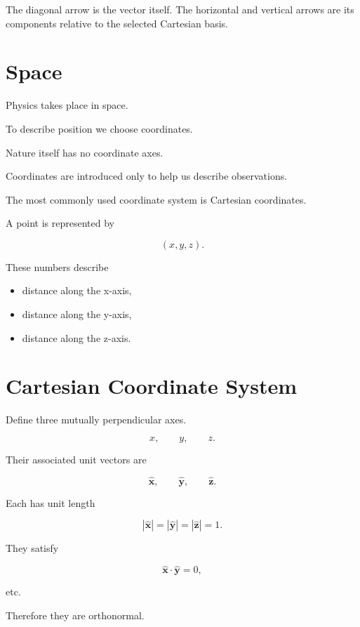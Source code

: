 \documentclass[11pt,a4paper,openany]{book}
\begin{document}
\begin{visualguidebox}
The diagonal arrow is the vector itself. The horizontal and vertical arrows are
its components relative to the selected Cartesian basis.
\end{visualguidebox}


\section{Space}

Physics takes place in space.

To describe position we choose coordinates.

Nature itself has no coordinate axes.

Coordinates are introduced only to help us describe observations.

The most commonly used coordinate system is Cartesian coordinates.

A point is represented by

\[
(x,y,z).
\]

These numbers describe

\begin{itemize}
	\item distance along the x-axis,
	\item distance along the y-axis,
	\item distance along the z-axis.
\end{itemize}


\section{Cartesian Coordinate System}

Define three mutually perpendicular axes.

\[
x,
\qquad
y,
\qquad
z.
\]

Their associated unit vectors are

\[
\hat{\mathbf x},
\qquad
\hat{\mathbf y},
\qquad
\hat{\mathbf z}.
\]

Each has unit length

\[
|\hat{\mathbf x}|=
|\hat{\mathbf y}|=
|\hat{\mathbf z}|=1.
\]

They satisfy

\[
\hat{\mathbf x}\cdot\hat{\mathbf y}=0,
\]

etc.

Therefore they are orthonormal.
\end{document}

